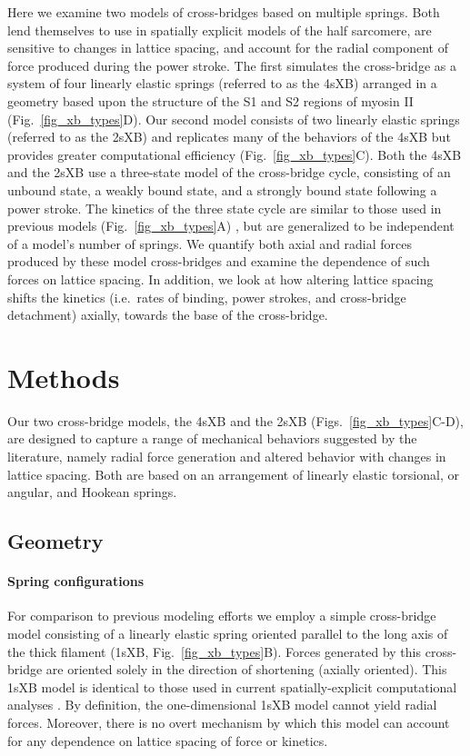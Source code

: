 \documentclass[]{article}
\begin{document}
Here we examine two models of cross-bridges based on multiple springs.  
Both lend themselves to use in spatially explicit models of the half sarcomere, are sensitive to changes in lattice spacing, and account for the radial component of force produced during the power stroke. 
The first simulates the cross-bridge as a system of four linearly elastic springs (referred to as the 4sXB) arranged in a geometry based upon the structure of the S1 and S2 regions of myosin II (Fig.~\ref{fig_xb_types}D). 
Our second model consists of two linearly elastic springs (referred to as the 2sXB) and replicates many of the behaviors of the 4sXB but provides greater computational efficiency (Fig.~\ref{fig_xb_types}C). 
Both the 4sXB and the 2sXB use a three-state model of the cross-bridge cycle, consisting of an unbound state, a weakly bound state, and a strongly bound state following a power stroke. 
The kinetics of the three state cycle are similar to those used in previous models (Fig.~\ref{fig_xb_types}A) \citep{Pate1989, Daniel1998, Tanner2007}, but are generalized to be independent of a model's number of springs.
We quantify both axial and radial forces produced by these model cross-bridges and examine the dependence of such forces on lattice spacing.
In addition, we look at how altering lattice spacing shifts the kinetics (i.e.\ rates of binding, power strokes, and cross-bridge detachment) axially, towards the base of the cross-bridge. 


\section*{Methods}  %

Our two cross-bridge models, the 4sXB and the 2sXB (Figs.~\ref{fig_xb_types}C-D), are designed to capture a range of mechanical behaviors suggested by the literature, namely radial force generation and altered behavior with changes in lattice spacing.  
Both are based on an arrangement of linearly elastic torsional, or angular, and Hookean springs.  

\subsection*{Geometry} %

\paragraph{Spring configurations} %
For comparison to previous modeling efforts we employ a simple cross-bridge model consisting of a linearly elastic spring oriented parallel to the long axis of the thick filament (1sXB, Fig.~\ref{fig_xb_types}B).  
Forces generated by this cross-bridge are oriented solely in the direction of shortening (axially oriented). 
This 1sXB model is identical to those used in current spatially-explicit computational analyses \citep{Daniel1998, Chase2004, Tanner2007}. 
By definition, the one-dimensional 1sXB model cannot yield radial forces.  
Moreover, there is no overt mechanism by which this model can account for any dependence on lattice spacing of force or kinetics.
\end{document}
